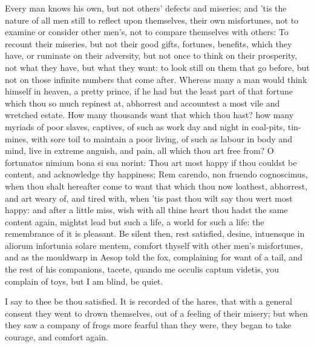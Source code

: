 {Every man knows his own, but not others' defects and miseries;
and 'tis the nature of all men still to reflect upon themselves, their
own misfortunes, not to examine or consider other men's, not to compare
themselves with others: To recount their miseries, but not their good
gifts, fortunes, benefits, which they have, or ruminate on their
adversity, but not once to think on their prosperity, not what they
have, but what they want: to look still on them that go before, but not
on those infinite numbers that come after. Whereas many a man
would think himself in heaven, a pretty prince, if he had but the least
part of that fortune which thou so much repinest at, abhorrest and
accountest a most vile and wretched estate. How many thousands want
that which thou hast? how many myriads of poor slaves, captives, of
such as work day and night in coal-pits, tin-mines, with sore toil to
maintain a poor living, of such as labour in body and mind, live in
extreme anguish, and pain, all which thou art free from? O fortunatos
nimium bona si sua norint: Thou art most happy if thou couldst be
content, and acknowledge thy happiness; Rem carendo, non fruendo
cognoscimus, when thou shalt hereafter come to want that which thou now
loathest, abhorrest, and art weary of, and tired with, when 'tis past
thou wilt say thou wert most happy: and after a little miss, wish with
all thine heart thou hadst the same content again, mightst lead but
such a life, a world for such a life: the remembrance of it is
pleasant. Be silent then, rest satisfied, desine, intuensque in
aliorum infortunia solare mentem, comfort thyself with other men's
misfortunes, and as the mouldwarp in Aesop told the fox, complaining
for want of a tail, and the rest of his companions, tacete, quando me
occulis captum videtis, you complain of toys, but I am blind, be quiet.

I say to thee be thou satisfied. It is recorded of the hares,
that with a general consent they went to drown themselves, out of a
feeling of their misery; but when they saw a company of frogs more
fearful than they were, they began to take courage, and comfort again.

}
